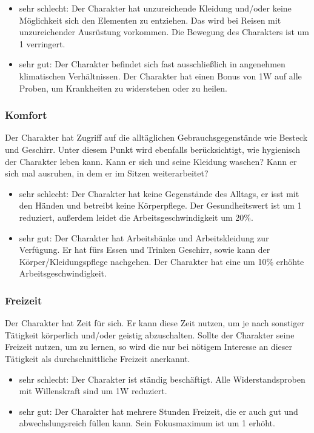 \documentclass{article}
\begin{document}
\begin{itemize}
\item sehr schlecht: Der Charakter hat unzureichende Kleidung und/oder keine Möglichkeit sich den Elementen zu entziehen. Das wird bei Reisen mit unzureichender Ausrüstung vorkommen. Die Bewegung des Charakters ist um 1 verringert.
\item sehr gut: Der Charakter befindet sich fast ausschließlich in angenehmen klimatischen Verhältnissen. Der Charakter hat einen Bonus von 1W auf alle Proben, um Krankheiten zu widerstehen oder zu heilen.
\end{itemize}

\subsubsection{Komfort}

Der Charakter hat Zugriff auf die alltäglichen Gebrauchsgegenstände wie Besteck und Geschirr. Unter diesem Punkt wird
ebenfalls berücksichtigt, wie hygienisch der Charakter leben kann. Kann er sich und seine Kleidung waschen? Kann er
sich mal ausruhen, in dem er im Sitzen weiterarbeitet?

\begin{itemize}
\item sehr schlecht: Der Charakter hat keine Gegenstände des Alltags, er isst mit den Händen und betreibt keine Körperpflege. Der Gesundheitswert ist um 1 reduziert, außerdem leidet die Arbeitsgeschwindigkeit um 20\%.
\item sehr gut: Der Charakter hat Arbeitsbänke und Arbeitskleidung zur Verfügung. Er hat fürs Essen und Trinken Geschirr, sowie kann der Körper/Kleidungspflege nachgehen. Der Charakter hat eine um 10\% erhöhte Arbeitsgeschwindigkeit.
\end{itemize}

\subsubsection{Freizeit}

Der Charakter hat Zeit für sich. Er kann diese Zeit nutzen, um je nach sonstiger Tätigkeit körperlich und/oder geistig
abzuschalten. Sollte der Charakter seine Freizeit nutzen, um zu lernen, so wird die nur bei nötigem Interesse an dieser
Tätigkeit als durchschnittliche Freizeit anerkannt.

\begin{itemize}
\item sehr schlecht: Der Charakter ist ständig beschäftigt. Alle Widerstandsproben mit Willenskraft sind um 1W reduziert.
\item sehr gut: Der Charakter hat mehrere Stunden Freizeit, die er auch gut und abwechslungsreich füllen kann. Sein Fokusmaximum ist um 1 erhöht.
\end{itemize}
\end{document}
